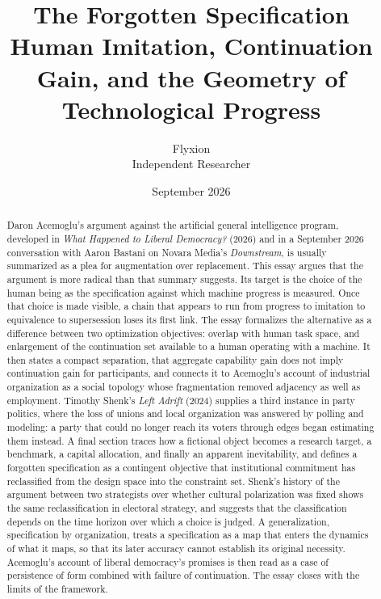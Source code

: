 \documentclass[11pt]{article}
\title{The Forgotten Specification\\[0.4em]
\large Human Imitation, Continuation Gain, and the Geometry of Technological Progress}
\author{Flyxion\\Independent Researcher}
\date{September 2026}
\begin{document}
\maketitle

\begin{abstract}
Daron Acemoglu's argument against the artificial general intelligence program, developed in \emph{What Happened to Liberal Democracy?} (2026) and in a September 2026 conversation with Aaron Bastani on Novara Media's \emph{Downstream}, is usually summarized as a plea for augmentation over replacement. This essay argues that the argument is more radical than that summary suggests. Its target is the choice of the human being as the specification against which machine progress is measured. Once that choice is made visible, a chain that appears to run from progress to imitation to equivalence to supersession loses its first link. The essay formalizes the alternative as a difference between two optimization objectives: overlap with human task space, and enlargement of the continuation set available to a human operating with a machine. It then states a compact separation, that aggregate capability gain does not imply continuation gain for participants, and connects it to Acemoglu's account of industrial organization as a social topology whose fragmentation removed adjacency as well as employment. Timothy Shenk's \emph{Left Adrift} (2024) supplies a third instance in party politics, where the loss of unions and local organization was answered by polling and modeling: a party that could no longer reach its voters through edges began estimating them instead. A final section traces how a fictional object becomes a research target, a benchmark, a capital allocation, and finally an apparent inevitability, and defines a forgotten specification as a contingent objective that institutional commitment has reclassified from the design space into the constraint set. Shenk's history of the argument between two strategists over whether cultural polarization was fixed shows the same reclassification in electoral strategy, and suggests that the classification depends on the time horizon over which a choice is judged. A generalization, specification by organization, treats a specification as a map that enters the dynamics of what it maps, so that its later accuracy cannot establish its original necessity. Acemoglu's account of liberal democracy's promises is then read as a case of persistence of form combined with failure of continuation. The essay closes with the limits of the framework.
\end{abstract}
\end{document}
